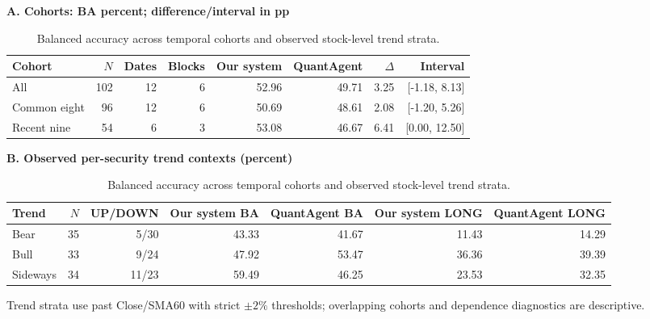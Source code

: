 \begin{table}[htb]
\centering\small
\setlength{\tabcolsep}{3pt}
\renewcommand{\arraystretch}{1.15}
\caption{Balanced accuracy across temporal cohorts and observed stock-level trend strata.}
\label{tab:temporal}
\textbf{A. Cohorts: BA percent; difference/interval in pp}\par\smallskip
\begin{tabular}{lrrrrrrr}
\hline
Cohort & $N$ & Dates & Blocks & Our system & QuantAgent & $\Delta$ & Interval \\
\hline
All & 102 & 12 & 6 & 52.96 & 49.71 & 3.25 & [-1.18, 8.13] \\
Common eight & 96 & 12 & 6 & 50.69 & 48.61 & 2.08 & [-1.20, 5.26] \\
Recent nine & 54 & 6 & 3 & 53.08 & 46.67 & 6.41 & [0.00, 12.50] \\
\hline
\end{tabular}\par\medskip
\textbf{B. Observed per-security trend contexts (percent)}\par\smallskip
\begin{tabular}{lrrrrrr}
\hline
Trend & $N$ & UP/DOWN & Our system BA & QuantAgent BA & Our system LONG & QuantAgent LONG \\
\hline
Bear & 35 & 5/30 & 43.33 & 41.67 & 11.43 & 14.29 \\
Bull & 33 & 9/24 & 47.92 & 53.47 & 36.36 & 39.39 \\
Sideways & 34 & 11/23 & 59.49 & 46.25 & 23.53 & 32.35 \\
\hline
\end{tabular}\par\medskip
\begin{minipage}{\textwidth}\footnotesize Trend strata use past Close/SMA60 with strict $\pm2\%$ thresholds; overlapping cohorts and dependence diagnostics are descriptive.\end{minipage}
\end{table}
